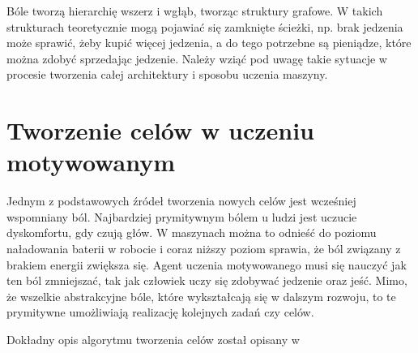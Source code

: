 Bóle tworzą hierarchię wszerz i wgłąb, tworząc struktury grafowe. 
W takich strukturach teoretycznie mogą pojawiać się zamknięte ścieżki, np. brak
jedzenia może sprawić, żeby kupić więcej jedzenia, a do tego potrzebne są 
pieniądze, które można zdobyć sprzedając jedzenie. Należy wziąć pod uwagę takie 
sytuacje w procesie tworzenia całej architektury i sposobu uczenia maszyny.

\section{Tworzenie celów w uczeniu motywowanym}

Jednym z podstawowych źródeł tworzenia nowych celów jest wcześniej wspomniany 
ból. Najbardziej prymitywnym bólem u ludzi jest uczucie dyskomfortu, gdy czują 
głów. W maszynach można to odnieść do poziomu naładowania baterii w robocie i 
coraz niższy poziom sprawia, że ból związany z brakiem energii zwiększa się. 
Agent uczenia motywowanego musi się nauczyć jak ten ból zmniejszać, tak jak 
człowiek uczy się zdobywać jedzenie oraz jeść. Mimo, że wszelkie abstrakcyjne 
bóle, które wykształcają się w dalszym rozwoju, to te prymitywne umożliwiają 
realizację kolejnych zadań czy celów.

Dokładny opis algorytmu tworzenia celów został opisany w 
\cite{ml_comp_int}

